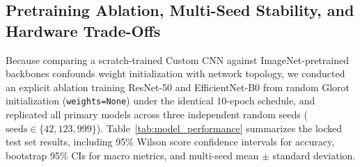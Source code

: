 \documentclass[journal]{IEEEtran}
\begin{document}
\subsection{Pretraining Ablation, Multi-Seed Stability, and Hardware Trade-Offs}
Because comparing a scratch-trained Custom CNN against ImageNet-pretrained backbones confounds weight initialization with network topology, we conducted an explicit ablation training ResNet-50 and EfficientNet-B0 from random Glorot initialization (\texttt{weights=None}) under the identical 10-epoch schedule, and replicated all primary models across three independent random seeds ($\text{seeds} \in \{42, 123, 999\}$). Table~\ref{tab:model_performance} summarizes the locked test set results, including 95\% Wilson score confidence intervals for accuracy, bootstrap 95\% CIs for macro metrics, and multi-seed mean $\pm$ standard deviation.

\begin{table}[!t]
\caption{Locked Test Split Benchmark ($N=8,146$), 95\% Confidence Intervals, Pretraining Ablation, and Multi-Seed Stability}
\label{tab:model_performance}
\centering
{}
\end{table}
\end{document}
